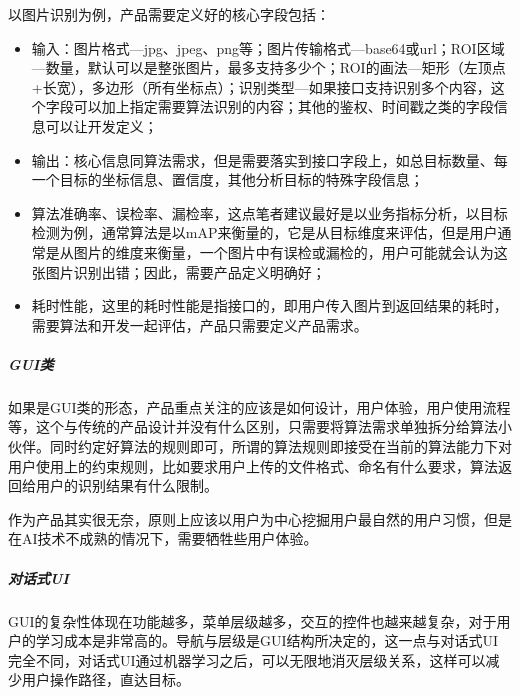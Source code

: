 \documentclass[letterpaper,11pt,english]{sphinxmanual}
\begin{document}
以图片识别为例，产品需要定义好的核心字段包括：
\begin{itemize}
\item {} 
输入：图片格式—jpg、jpeg、png等；图片传输格式—base64或url；ROI区域—数量，默认可以是整张图片，最多支持多少个；ROI的画法—矩形（左顶点+长宽），多边形（所有坐标点）；识别类型—如果接口支持识别多个内容，这个字段可以加上指定需要算法识别的内容；其他的鉴权、时间戳之类的字段信息可以让开发定义；

\item {} 
输出：核心信息同算法需求，但是需要落实到接口字段上，如总目标数量、每一个目标的坐标信息、置信度，其他分析目标的特殊字段信息；

\item {} 
算法准确率、误检率、漏检率，这点笔者建议最好是以业务指标分析，以目标检测为例，通常算法是以mAP来衡量的，它是从目标维度来评估，但是用户通常是从图片的维度来衡量，一个图片中有误检或漏检的，用户可能就会认为这张图片识别出错；因此，需要产品定义明确好；

\item {} 
耗时性能，这里的耗时性能是指接口的，即用户传入图片到返回结果的耗时，需要算法和开发一起评估，产品只需要定义产品需求。

\end{itemize}


\subparagraph{GUI类}
\label{\detokenize{chapter_introduction/AI_Product:gui}}
如果是GUI类的形态，产品重点关注的应该是如何设计，用户体验，用户使用流程等，这个与传统的产品设计并没有什么区别，只需要将算法需求单独拆分给算法小伙伴。同时约定好算法的规则即可，所谓的算法规则即接受在当前的算法能力下对用户使用上的约束规则，比如要求用户上传的文件格式、命名有什么要求，算法返回给用户的识别结果有什么限制。

作为产品其实很无奈，原则上应该以用户为中心挖掘用户最自然的用户习惯，但是在AI技术不成熟的情况下，需要牺牲些用户体验。


\subparagraph{对话式UI}
\label{\detokenize{chapter_introduction/AI_Product:ui}}
GUI的复杂性体现在功能越多，菜单层级越多，交互的控件也越来越复杂，对于用户的学习成本是非常高的。导航与层级是GUI结构所决定的，这一点与对话式UI完全不同，对话式UI通过机器学习之后，可以无限地消灭层级关系，这样可以减少用户操作路径，直达目标。%
\begin{footnote}[204]\sphinxAtStartFootnote
{}
%
\end{footnote}
\end{document}
